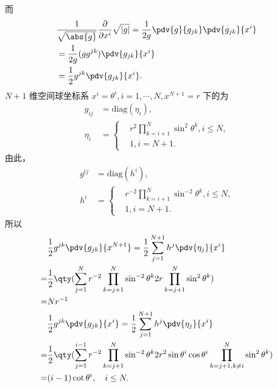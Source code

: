 而
\begin{equation}
\begin{aligned}
&\frac{1}{\sqrt{\abs{ g}}}\frac{\partial }{\partial x^i} \sqrt{ \left\lvert g \right\rvert }=\frac{1}{2g}\pdv{g}{g_{jk}}\pdv{g_{jk}}{x^i}\\
&=\frac{1}{2g}(gg^{jk})\pdv{g_{jk}}{x^i}\\
&=\frac{1}{2}g^{jk}\pdv{g_{jk}}{x^i}.
\end{aligned}~
\end{equation}
$N+1$ 维空间球坐标系 $x^i=\theta^i,i=1,\cdots,N,x^{N+1}=r$ 下的为
\begin{equation}
\begin{aligned}
g_{ij}&=\mathrm{diag}(\eta_i),\\
\eta_{i}&=\left\{\begin{aligned}
& r^2\prod\limits_{k=i+1}^{N}\sin^2\theta^{k},i\leq N,\\
&1,i=N+1.
\end{aligned}\right.
\end{aligned}~
\end{equation}
由此，
\begin{equation}\label{eq_HDsphF_1}
\begin{aligned}
g^{ij}&=\mathrm{diag}(h^i),\\
h^{i}&=\left\{\begin{aligned}
& r^{-2}\prod\limits_{k=i+1}^{N}\sin^{-2}\theta^{k},i\leq N,\\
&1,i=N+1.
\end{aligned}\right.
\end{aligned}~
\end{equation}
所以
\begin{equation}
\begin{aligned}
&\frac{1}{2}g^{jk}\pdv{g_{jk}}{x^{N+1}}=\frac{1}{2}\sum_{j=1}^{N+1}h^{j}\pdv{\eta_{j}}{x^i}\\
=&\frac{1}{2}\qty(\sum_{j=1}^{N}r^{-2}\prod\limits_{k=j+1}^{N}\sin^{-2}\theta^{k}2r\prod\limits_{k=j+1}^{N}\sin^2\theta^{k})\\
=&Nr^{-1}\\
&\frac{1}{2}g^{jk}\pdv{g_{jk}}{x^i}=\frac{1}{2}\sum_{j=1}^{N+1}h^{j}\pdv{\eta_{j}}{x^i}\\
=&\frac{1}{2}\qty(\sum_{j=1}^{i-1}r^{-2}\prod\limits_{k=j+1}^{N}\sin^{-2}\theta^{k}2r^2\sin\theta^{i}\cos\theta^{i}\prod\limits_{k=j+1,k\neq i}^{N}\sin^2\theta^{k})\\
=&(i-1)\cot\theta^i,\quad i\leq N.
\end{aligned}~
\end{equation}
